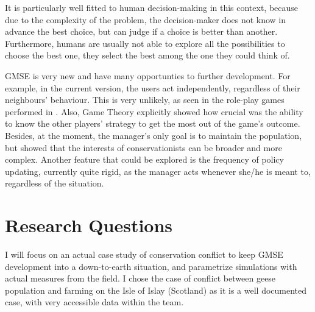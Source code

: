 \documentclass[12pt,a4paper]{article}
\begin{document}
It is particularly well fitted to human decision-making in this context, because due to the complexity of the problem, the decision-maker does not know in advance the best choice, but can judge if a choice is better than another.
Furthermore, humans are usually not able to explore all the possibilities to choose the best one, they select the best among the one they could think of.
%
%

GMSE is very new and have many opportunties to further development.
For example, in the current version, the users act independently, regardless of their neighbours' behaviour.
This is very unlikely, as seen in the role-play games performed in \cite{redpath2018games}.
Also, Game Theory explicitly showed how crucial was the ability to know the other players' strategy to get the most out of the game's outcome.
Besides, at the moment, the manager's only goal is to maintain the population, but \cite{holmes2017understanding} showed that the interests of conservationists can be broader and more complex.
Another feature that could be explored is the frequency of policy updating, currently quite rigid, as the manager acts whenever she/he is meant to, regardless of the situation.

\section{Research Questions}
I will focus on an actual case study of conservation conflict to keep GMSE development into a down-to-earth situation, and parametrize simulations with actual measures from the field.
I chose the case of conflict between geese population and farming on the Isle of Islay (Scotland) as it is a well documented case, with very accessible data within the team.
\end{document}
